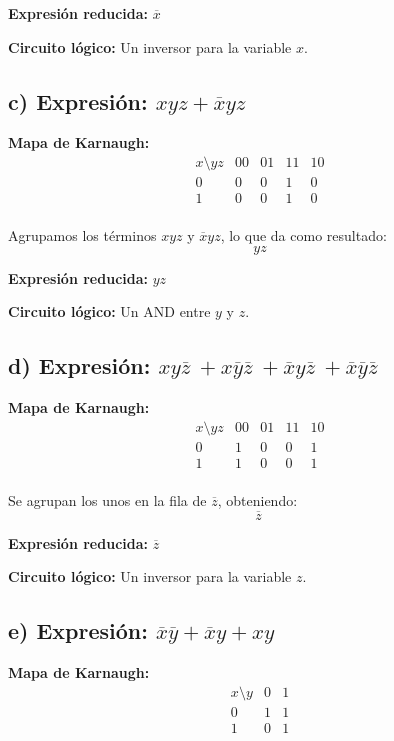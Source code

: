 \documentclass[11pt,letterpaper]{article}
\begin{document}
\textbf{Expresión reducida:} \( \overline{x} \)

\textbf{Circuito lógico:} Un inversor para la variable \( x \).

\subsection*{c) Expresión: \( xyz + \overline{x}yz \)}

\textbf{Mapa de Karnaugh:}
\[
\begin{array}{c|cccc}
x \setminus yz & 00 & 01 & 11 & 10 \\
\hline
0 & 0 & 0 & 1 & 0 \\
1 & 0 & 0 & 1 & 0 \\
\end{array}
\]

Agrupamos los términos \( xyz \) y \( \overline{x}yz \), lo que da como resultado:
\[
yz
\]

\textbf{Expresión reducida:} \( yz \)

\textbf{Circuito lógico:} Un AND entre \( y \) y \( z \).

\subsection*{d) Expresión: \( xy\overline{z} \ + x\overline{y} \overline{z} \ + \overline{x}y\overline{z} \ + \overline{x}\overline{y} \overline{z} \)}

\textbf{Mapa de Karnaugh:}
\[
\begin{array}{c|cccc}
x \setminus yz & 00 & 01 & 11 & 10 \\
\hline
0 & 1 & 0 & 0 & 1 \\
1 & 1 & 0 & 0 & 1 \\
\end{array}
\]

Se agrupan los unos en la fila de \( \overline{z} \), obteniendo:
\[
\overline{z} \
\]

\textbf{Expresión reducida:} \( \overline{z} \)

\textbf{Circuito lógico:} Un inversor para la variable \( z \).

\subsection*{e) Expresión: \( \overline{x}\overline{y} + \overline{x}y + xy \)}

\textbf{Mapa de Karnaugh:}
\[
\begin{array}{c|cc}
x \setminus y & 0 & 1 \\
\hline
0 & 1 & 1 \\
1 & 0 & 1 \\
\end{array}
\]
\end{document}
